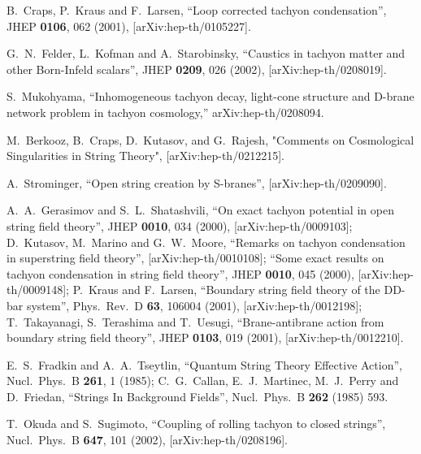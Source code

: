 \documentclass[a4paper,12pt]{article}
\begin{document}
\begin{thebibliography}{99}
B.~Craps, P.~Kraus and F.~Larsen,
``Loop corrected tachyon condensation'',
JHEP {\bf 0106}, 062 (2001),
[arXiv:hep-th/0105227].

G.~N.~Felder, L.~Kofman and A.~Starobinsky,
``Caustics in tachyon matter and other Born-Infeld scalars'',
JHEP {\bf 0209}, 026 (2002),
[arXiv:hep-th/0208019].

S.~Mukohyama,
``Inhomogeneous tachyon decay, light-cone structure and D-brane network  problem in tachyon cosmology,''
arXiv:hep-th/0208094.

M.~Berkooz, B.~Craps, D.~Kutasov, and G.~Rajesh,
"Comments on Cosmological Singularities in String Theory", 
[arXiv:hep-th/0212215].


A.~Strominger,
``Open string creation by S-branes'',
[arXiv:hep-th/0209090].




A.~A.~Gerasimov and S.~L.~Shatashvili,
``On exact tachyon potential in open string field theory'',
JHEP {\bf 0010}, 034 (2000),
[arXiv:hep-th/0009103];
D.~Kutasov, M.~Marino and G.~W.~Moore,
``Remarks on tachyon condensation in superstring field theory'',
[arXiv:hep-th/0010108];
``Some exact results on tachyon condensation in string field theory'',
JHEP {\bf 0010}, 045 (2000),
[arXiv:hep-th/0009148];
P.~Kraus and F.~Larsen,
``Boundary string field theory of the DD-bar system'',
Phys.\ Rev.\ D {\bf 63}, 106004 (2001),
[arXiv:hep-th/0012198];
T.~Takayanagi, S.~Terashima and T.~Uesugi,
``Brane-antibrane action from boundary string field theory'',
JHEP {\bf 0103}, 019 (2001),
[arXiv:hep-th/0012210].

E.~S.~Fradkin and A.~A.~Tseytlin,
``Quantum String Theory Effective Action'',
Nucl.\ Phys.\ B {\bf 261}, 1 (1985);
C.~G.~Callan, E.~J.~Martinec, M.~J.~Perry and D.~Friedan,
``Strings In Background Fields'',
Nucl.\ Phys.\ B {\bf 262} (1985) 593.

T.~Okuda and S.~Sugimoto,
``Coupling of rolling tachyon to closed strings'',
Nucl.\ Phys.\ B {\bf 647}, 101 (2002),
[arXiv:hep-th/0208196].


\end{thebibliography}
\end{document}
